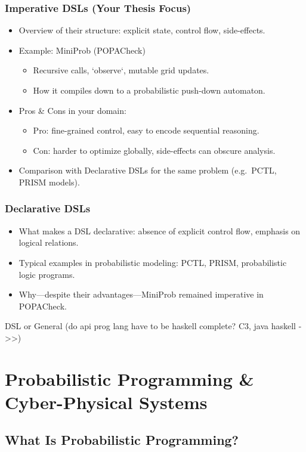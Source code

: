 \documentclass[11pt]{report}
\begin{document}
\subsection{Imperative DSLs (Your Thesis Focus)}
\begin{itemize}
  \item Overview of their structure: explicit state, control flow, side-effects.
  \item Example: MiniProb (POPACheck)  
    \begin{itemize}
      \item Recursive calls, `observe`, mutable grid updates.  
      \item How it compiles down to a probabilistic push-down automaton.  
    \end{itemize}
  \item Pros \& Cons in your domain:  
    \begin{itemize}
      \item Pro: fine-grained control, easy to encode sequential reasoning.  
      \item Con: harder to optimize globally, side-effects can obscure analysis.  
    \end{itemize}
  \item Comparison with Declarative DSLs for the same problem (e.g.\ PCTL, PRISM models).  
\end{itemize}

\subsection{Declarative DSLs}
\begin{itemize}
  \item What makes a DSL declarative: absence of explicit control flow, emphasis on logical relations.  
  \item Typical examples in probabilistic modeling: PCTL, PRISM, probabilistic logic programs.  
  \item Why—despite their advantages—MiniProb remained imperative in POPACheck.  
\end{itemize}


DSL or General (do api prog lang have to be haskell complete? C3, java haskell ->>)

\chapter{Probabilistic Programming \& Cyber-Physical Systems}
\section{What Is Probabilistic Programming?}
\end{document}
